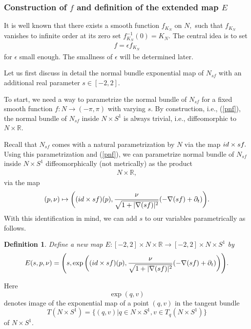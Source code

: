 \documentclass[11pt,a4paper]{amsart}
\numberwithin{equation}{section}
\newcommand{\e}{\epsilon}
\newcommand{\m}{^{-1}}
\newcommand{\pd}{\partial}
\newcommand{\na}{\nabla}
\newcommand{\R}{\mathbb{R}}
\newcommand{\id}{\textnormal{id}}
\theoremstyle{plain}
\newtheorem{defn}[exam]{Definition}
\theoremstyle{definition}
\numberwithin{equation}{subsection}
\begin{document}
\subsubsection{Construction of $f$ and definition of the extended map $E$}
It is well known that there exists a smooth function $f_{K_N}$ on $N,$ such that $f_{K_N}$ vanishes to infinite order at its zero set $f_{K_N}\m(0)=K_N.$ The central idea is to set 
\begin{align}\label{fek}
f=\e  f_{K_N}
\end{align}
 for $\e$ small enough. The smallness of $\e$ will be determined later.

Let us first discuss in detail the normal bundle exponential map of $N_{sf}$ with an additional real parameter $s\in[-2,2].$ %

To start, we need a way to parametrize the normal bundle of $N_{sf}$ for a fixed smooth function $f:N\to (-\pi,\pi)$ with varying $s.$ By construction, i.e., (\ref{pnf}), the normal bundle of $N_{sf}$ inside $N\times S^1$ is always trivial, i.e., diffeomorphic to $N\times \R$. 

Recall that $N_{sf}$ comes with a natural parametrization by $N$ via the map $\id\times sf.$ Using this parametrization and (\ref{pnf}), we can parametrize normal bundle of $N_{sf}$ inside $N\times S^1$  diffeomorphically (not metrically) as the product
\begin{align*}
N\times \R,
\end{align*}
via the map
\begin{align*}
	(p,\nu)\mapsto\bigg((\id\times sf)(p),\frac{\nu}{\sqrt{1+|\na (sf)|^2}}(-\na (sf)+\pd_t)\bigg).
\end{align*}
With this identification in mind, we can add $s$ to our variables parametrically as follows. 
\begin{defn}\label{defnfs}
Define a new map
$E:[-2,2]\times N\times \R\to [-2,2]\times N\times S^1$ by
\begin{align}\label{defnes}
	E(s,p,\nu)=\Bigg(s,\exp\bigg((\id\times sf)(p),\frac{\nu}{\sqrt{1+|\na (sf)|^2}}(-\na (sf)+\pd_t)\bigg)\Bigg).
\end{align} %
\end{defn}
Here $$\exp(q,v)$$ denotes image of the exponential map of a point $(q,v)$ in the tangent bundle $$T(N\times S^1)=\{(q,v)|q\in N\times S^1,v\in T_q(N\times S^1)\}$$ of $N\times S^1.$ %
\end{document}
